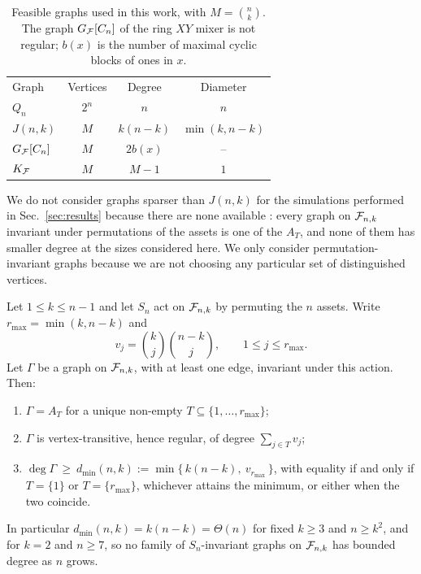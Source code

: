 \begin{table}[b]
\caption{\label{tab:graph-zoo}Feasible graphs used in this work, with
$M=\binom{n}{k}$. The graph $G_{\mathcal{F}}[C_n]$ of the ring $XY$ mixer is not regular; $b(x)$ is the number of maximal cyclic blocks of ones in $x$. }
\begin{ruledtabular}
\begin{tabular}{lccc}
Graph & Vertices & Degree & Diameter \\
\colrule
$Q_n$ & $2^n$ & $n$ & $n$ \\
$J(n,k)$ & $M$ & $k(n-k)$ & $\min(k,n-k)$ \\
$G_{\mathcal{F}}[C_n]$ & $M$ & $2b(x)$ & -- \\ %
$K_{\mathcal{F}}$ & $M$ & $M-1$ & $1$ \\
\end{tabular}
\end{ruledtabular}
\end{table}

We do not consider graphs sparser than $J(n,k)$ for the simulations performed in Sec.~\ref{sec:results} because there are none available : every graph on $\mathcal{F}_{n,k}$ invariant under permutations of the assets is one of the $A_T$, and none of them has smaller degree at the sizes considered here. We only consider permutation-invariant graphs because we are not choosing any particular set of distinguished vertices.

\begin{proposition}
\label{prop:min-degree}
Let $1\le k\le n-1$ and let $S_n$ act on $\mathcal{F}_{n,k}$ by permuting the $n$ assets. Write $r_{\max}=\min(k,n-k)$ and
\begin{equation}
v_j=\binom{k}{j}\binom{n-k}{j},\qquad 1\le j\le r_{\max}.
    \label{eq:valency}
\end{equation}
Let $\Gamma$ be a graph on $\mathcal{F}_{n,k}$, with at least one edge, invariant under this action. Then:
\begin{enumerate}
\item[(i)] $\Gamma=A_T$ for a unique non-empty
$T\subseteq\{1,\dots,r_{\max}\}$;
\item[(ii)] $\Gamma$ is vertex-transitive, hence regular, of degree
$\sum_{j\in T}v_j$;
\item[(iii)] $\deg\Gamma\ \ge\ d_{\min}(n,k):=\min\bigl\{\,k(n-k),\
v_{r_{\max}}\,\bigr\}$, with equality if and only if $T=\{1\}$ or $T=\{r_{\max}\}$, whichever attains the minimum, or either when the two coincide.
\end{enumerate}
In particular $d_{\min}(n,k)=k(n-k)=\Theta(n)$ for fixed $k\ge3$ and $n\ge k^{2}$, and for $k=2$ and $n\ge7$, so no family of $S_n$-invariant graphs on $\mathcal{F}_{n,k}$ has bounded degree as $n$ grows.
\end{proposition}

